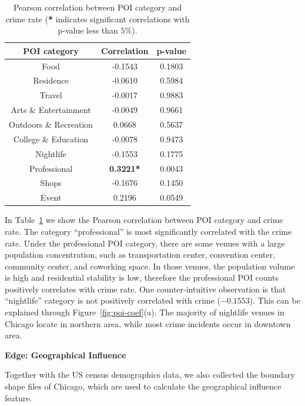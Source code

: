 \begin{table}[h]
\centering
\caption{Pearson correlation between POI category and crime rate (\textbf{*} indicates significant correlations with p-value less than $5\%$).}
\vspace{2mm}

\label{tb:poi-corr}
\begin{tabular}{|c ||c|c|}
\hline
POI category & Correlation & p-value \\ \hline \hline
Food & -0.1543 &  0.1803 \\ \hline
Residence &  -0.0610 &  0.5984 \\ \hline
Travel & -0.0017 &  0.9883 \\ \hline
Arts \& Entertainment & -0.0049 &  0.9661 \\ \hline
Outdoors \& Recreation &  0.0668 &  0.5637 \\ \hline
College \& Education & -0.0078 &  0.9473 \\ \hline
Nightlife &  -0.1553 &  0.1775 \\ \hline
Professional & \textbf{0.3221*} &  0.0043 \\ \hline
Shops & -0.1676 &  0.1450 \\ \hline
Event & 0.2196 &  0.0549  \\ \hline
\end{tabular}
\end{table}



In Table~\ref{tb:poi-corr} we show the Pearson correlation between POI category and crime rate. The category ``professional''  is most significantly correlated with the crime rate. Under the professional POI category, there are some venues with a large population concentration, such as transportation center, convention center, community center, and coworking space. In those venues, the  population volume is high and residential stability is low, therefore the professional POI counts positively correlates with crime rate.  One counter-intuitive observation is that ``nightlife'' category is not positively correlated with crime ($-0.1553$). This can be explained through Figure~\ref{fig:poi-coef}(a). The majority of nightlife venues in Chicago locate in northern area, while most crime incidents occur in downtown area.








\textbf{Edge: Geographical Influence}

Together with the US census demographics data, we also collected the boundary shape files of Chicago, which are used to calculate the geographical influence feature.

